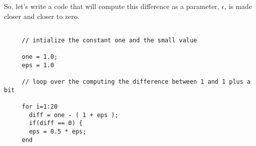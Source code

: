 \documentclass[10pt,fleqn]{article}
\begin{document}
So, let's write a code that will compute this difference as a parameter,
$\epsilon$, is made closer and closer to zero.
\begin{verbatim}

     // intialize the constant one and the small value

     one = 1.0;
     eps = 1.0

     // loop over the computing the difference between 1 and 1 plus a bit

     for i=1:20
       diff = one - ( 1 + eps );
       if(diff == 0) {
       eps = 0.5 * eps;
     end

\end{verbatim}




\end{document}

